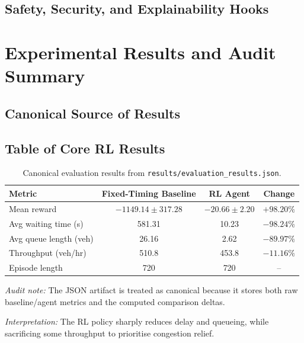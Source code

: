 \documentclass[conference]{IEEEtran}
\begin{document}
\subsection{Safety, Security, and Explainability Hooks}

\section{Experimental Results and Audit Summary}
\subsection{Canonical Source of Results}

\subsection{Table of Core RL Results}
\begin{table}[t]
\centering
\caption{Canonical evaluation results from \texttt{results/evaluation\_results.json}.}
\label{tab:rl-results}
\begin{threeparttable}
\begin{tabular}{lccc}
\toprule
\textbf{Metric} & \textbf{Fixed-Timing Baseline} & \textbf{RL Agent} & \textbf{Change} \\
\midrule
Mean reward & $-1149.14 \pm 317.28$ & $-20.66 \pm 2.20$ & $+98.20\%$ \\
Avg waiting time (s) & 581.31 & 10.23 & $-98.24\%$ \\
Avg queue length (veh) & 26.16 & 2.62 & $-89.97\%$ \\
Throughput (veh/hr) & 510.8 & 453.8 & $-11.16\%$ \\
Episode length & 720 & 720 & -- \\
\bottomrule
\end{tabular}
\begin{tablenotes}
\footnotesize
\item \textit{Audit note:} The JSON artifact is treated as canonical because it stores both raw baseline/agent metrics and the computed comparison deltas.
\item \textit{Interpretation:} The RL policy sharply reduces delay and queueing, while sacrificing some throughput to prioritise congestion relief.
\end{tablenotes}
\end{threeparttable}
\end{table}
\end{document}
